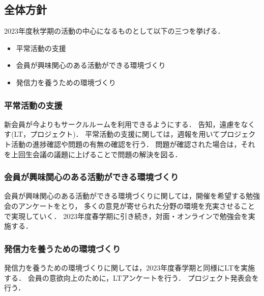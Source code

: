\subsection*{全体方針}

2023年度秋学期の活動の中心になるものとして以下の三つを挙げる．
\begin{itemize}
  \item 平常活動の支援
  \item 会員が興味関心のある活動ができる環境づくり
  \item 発信力を養うための環境づくり
\end{itemize}

\subsubsection*{平常活動の支援}
新会員が今よりもサークルルームを利用できるようにする．
告知，遠慮をなくす(LT，プロジェクト)．
平常活動の支援に関しては，週報を用いてプロジェクト活動の進捗確認や問題の有無の確認を行う．
問題が確認された場合は，それを上回生会議の議題に上げることで問題の解決を図る．

\subsubsection*{会員が興味関心のある活動ができる環境づくり}
会員が興味関心のある活動ができる環境づくりに関しては，開催を希望する勉強会のアンケートをとり，
多くの意見が寄せられた分野の環境を充実させることで実現していく．
2023年度春学期に引き続き，対面・オンラインで勉強会を実施する．

\subsubsection*{発信力を養うための環境づくり}
発信力を養うための環境づくりに関しては，2023年度春学期と同様にLTを実施する．
会員の意欲向上のために，LTアンケートを行う．
プロジェクト発表会を行う．
